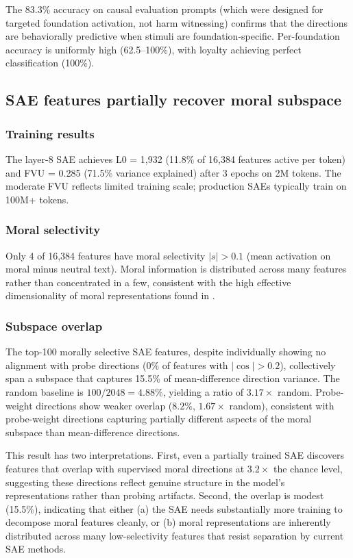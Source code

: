 The 83.3\% accuracy on causal evaluation prompts (which were designed for targeted foundation activation, not harm witnessing) confirms that the directions are behaviorally predictive when stimuli are foundation-specific.
Per-foundation accuracy is uniformly high (62.5--100\%), with loyalty achieving perfect classification (100\%).

\subsection{\texorpdfstring{SAE features partially recover moral subspace \label{sae-analysis}}{SAE features partially recover moral subspace }}\label{sae-features-partially-recover-moral-subspace}

\subsubsection{Training results}\label{training-results}

The layer-8 SAE achieves L0 = 1,932 (11.8\% of 16,384 features active per token) and FVU = 0.285 (71.5\% variance explained) after 3 epochs on 2M tokens.
The moderate FVU reflects limited training scale; production SAEs typically train on 100M+ tokens.

\subsubsection{Moral selectivity}\label{moral-selectivity}

Only 4 of 16,384 features have moral selectivity \(|s| > 0.1\) (mean activation on moral minus neutral text).
Moral information is distributed across many features rather than concentrated in a few, consistent with the high effective dimensionality of moral representations found in \citet{reblitzrichardson2026geometry}.

\subsubsection{Subspace overlap}\label{subspace-overlap}

The top-100 morally selective SAE features, despite individually showing no alignment with probe directions (\(0\%\) of features with \(|\cos| > 0.2\)), collectively span a subspace that captures 15.5\% of mean-difference direction variance.
The random baseline is \(100/2048 = 4.88\%\), yielding a ratio of \(3.17\times\) random.
Probe-weight directions show weaker overlap (\(8.2\%\), \(1.67\times\) random), consistent with probe-weight directions capturing partially different aspects of the moral subspace than mean-difference directions.

This result has two interpretations.
First, even a partially trained SAE discovers features that overlap with supervised moral directions at \(3.2\times\) the chance level, suggesting these directions reflect genuine structure in the model's representations rather than probing artifacts.
Second, the overlap is modest (15.5\%), indicating that either (a) the SAE needs substantially more training to decompose moral features cleanly, or (b) moral representations are inherently distributed across many low-selectivity features that resist separation by current SAE methods.
